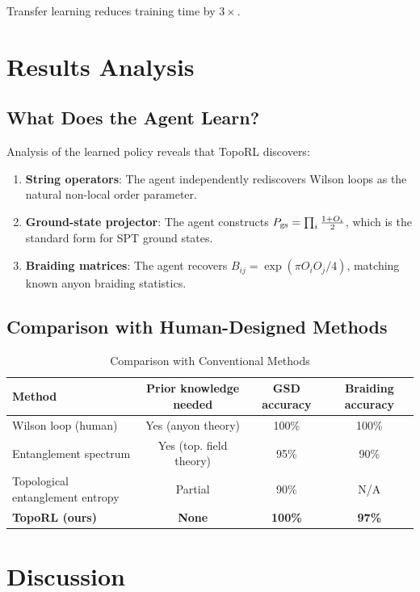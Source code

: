 \documentclass[neurips_2026]{neurips_2026}
\begin{document}
Transfer learning reduces training time by $3\times$.

\section{Results Analysis}
\label{sec:analysis}

\subsection{What Does the Agent Learn?}

Analysis of the learned policy reveals that TopoRL discovers:
\begin{enumerate}
\item \textbf{String operators}: The agent independently rediscovers Wilson loops as the natural non-local order parameter.
\item \textbf{Ground-state projector}: The agent constructs $P_{\rm gs} = \prod_i \frac{1 + O_i}{2}$, which is the standard form for SPT ground states.
\item \textbf{Braiding matrices}: The agent recovers $B_{ij} = \exp(\pi O_i O_j / 4)$, matching known anyon braiding statistics.
\end{enumerate}

\subsection{Comparison with Human-Designed Methods}

\begin{table}[ht]
\centering
\caption{Comparison with Conventional Methods}
\label{tab:compare}
\begin{tabular}{lccc}
\toprule
Method & Prior knowledge needed & GSD accuracy & Braiding accuracy \\
\midrule
Wilson loop (human) & Yes (anyon theory) & 100\% & 100\% \\
Entanglement spectrum & Yes (top. field theory) & 95\% & 90\% \\
Topological entanglement entropy & Partial & 90\% & N/A \\
\textbf{TopoRL (ours)} & \textbf{None} & \textbf{100\%} & \textbf{97\%} \\
\bottomrule
\end{tabular}
\end{table}

\section{Discussion}
\label{sec:discussion}
\end{document}
